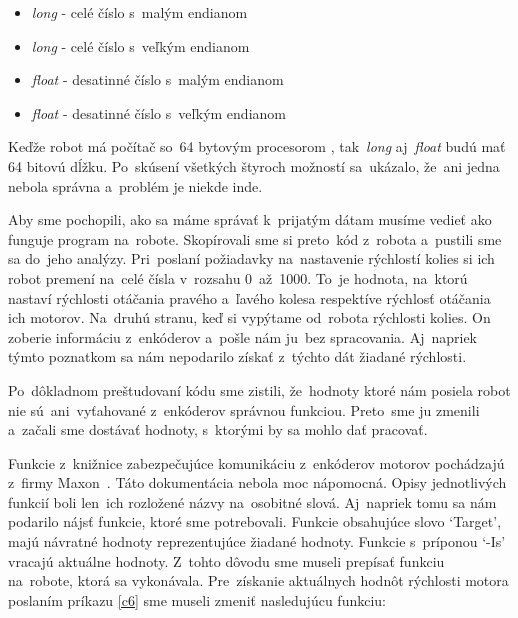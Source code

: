\begin{itemize}
	\item \textit{long} - celé číslo s~malým endianom
	\item \textit{long} - celé číslo s~veľkým endianom
	\item \textit{float} - desatinné číslo s~malým endianom
	\item \textit{float} - desatinné číslo s~veľkým endianom
\end{itemize}

Keďže robot má počítač so~64 bytovým procesorom \cite{robotPc}, tak~\textit{long} aj~\textit{float} budú mať 64 bitovú dĺžku. Po~skúsení všetkých
štyroch možností sa~ukázalo, že~ani jedna nebola správna a~problém je niekde inde.

Aby sme pochopili, ako sa máme správať k~prijatým dátam musíme vedieť ako funguje program na~robote.
Skopírovali sme si preto~kód z~robota a~pustili sme sa do~jeho analýzy. Pri~poslaní požiadavky
na~nastavenie rýchlostí kolies si ich robot premení na~celé čísla v~rozsahu 0~až~1000. To~je hodnota, na~ktorú nastaví
rýchlosti otáčania pravého a~ľavého kolesa respektíve rýchlosť otáčania ich motorov. Na~druhú stranu,
keď si vypýtame od~robota rýchlosti kolies. On zoberie informáciu z~enkóderov a~pošle nám ju~bez spracovania. Aj~napriek týmto poznatkom sa nám
nepodarilo získať z~týchto dát žiadané rýchlosti.

Po~dôkladnom preštudovaní kódu sme zistili, že~hodnoty ktoré nám posiela robot nie sú~ani~vyťahované z~enkóderov správnou funkciou. Preto~sme ju
zmenili a~začali sme dostávať hodnoty, s~ktorými by sa mohlo dať pracovať.

Funkcie z~knižnice zabezpečujúce komunikáciu z~enkóderov motorov pochádzajú z~firmy Maxon~\cite{EPOSdoc}. Táto dokumentácia nebola moc nápomocná.
Opisy jednotlivých funkcií boli len~ich rozložené názvy na~osobitné slová. Aj~napriek tomu sa nám podarilo nájsť funkcie, ktoré sme potrebovali.
Funkcie obsahujúce slovo `Target', majú návratné hodnoty reprezentujúce žiadané hodnoty. Funkcie s~príponou
`-Is' vracajú aktuálne hodnoty. Z~tohto dôvodu sme museli prepísať funkciu na~robote, ktorá sa vykonávala.
Pre~získanie aktuálnych hodnôt rýchlosti motora poslaním príkazu \ref{c6} sme museli zmeniť nasledujúcu funkciu:


